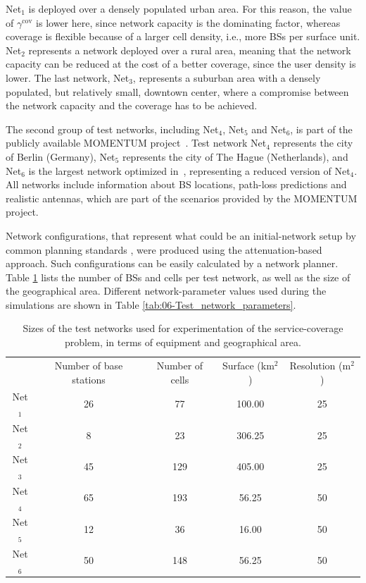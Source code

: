 Net$_{1}$ is deployed over a densely populated urban area. For this
reason, the value of $\gamma^{\mathrm{cov}}$ is lower here, since
network capacity is the dominating factor, whereas coverage is flexible
because of a larger cell density, i.e., more BSs per surface unit.
Net$_{2}$ represents a network deployed over a rural area, meaning
that the network capacity can be reduced at the cost of a better coverage,
since the user density is lower. The last network, Net$_{3}$, represents
a suburban area with a densely populated, but relatively small, downtown
center, where a compromise between the network capacity and the coverage
has to be achieved.

The second group of test networks, including Net$_{4}$, Net$_{5}$
and Net$_{6}$, is part of the publicly available MOMENTUM project~\cite{Momentum.project}.
Test network Net$_{4}$ represents the city of Berlin (Germany), Net$_{5}$
represents the city of The Hague (Netherlands), and Net$_{6}$ is
the largest network optimized in~\cite{Siomina:Minimum.pilot.power.for.service.coverage},
representing a reduced version of Net$_{4}$. All networks include
information about BS locations, path-loss predictions and realistic
antennas, which are part of the scenarios provided by the MOMENTUM
project.

Network configurations, that represent what could be an initial-network
setup by common planning standards \cite{Holma_WCDMA.for.UMTS:2005},
were produced using the attenuation-based approach. Such configurations
can be easily calculated by a network planner. Table \ref{tab:06-Test_network_sizes}
lists the number of BSs and cells per test network, as well as the
size of the geographical area. Different network-parameter values
used during the simulations are shown in Table \ref{tab:06-Test_network_parameters}.

\begin{table}
\caption{Sizes of the test networks used for experimentation of the service-coverage
problem, in terms of equipment and geographical area.\emph{\label{tab:06-Test_network_sizes}}}


\centering

{\small{}}%
\begin{tabular}{ccccc}
\toprule 
 & {\small{Number of base stations}} & {\small{Number of cells}} & {\small{Surface (km$^{2}$)}} & {\small{Resolution (m$^{2}$)}}\tabularnewline\addlinespace
\midrule
{\small{Net$_{1}$}} & {\small{26}} & {\small{77}} & {\small{100.00}} & {\small{25}}\tabularnewline
{\small{Net$_{2}$}} & {\small{8}} & {\small{23}} & {\small{306.25}} & {\small{25}}\tabularnewline
{\small{Net$_{3}$}} & {\small{45}} & {\small{129}} & {\small{405.00}} & {\small{25}}\tabularnewline
{\small{Net$_{4}$}} & {\small{65}} & {\small{193}} & {\small{56.25}} & {\small{50}}\tabularnewline
{\small{Net$_{5}$}} & {\small{12}} & {\small{36}} & {\small{16.00}} & {\small{50}}\tabularnewline
{\small{Net$_{6}$}} & {\small{50}} & {\small{148}} & {\small{56.25}} & {\small{50}}\tabularnewline
\bottomrule
\end{tabular}
\end{table}


